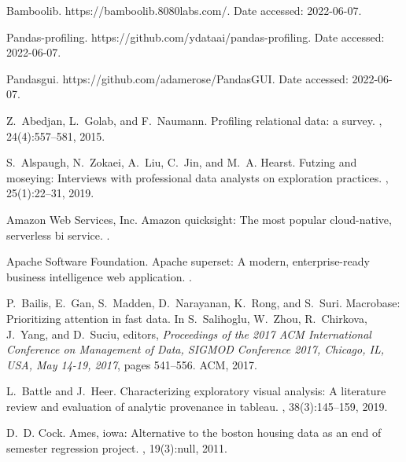 \documentclass[11pt]{article}
\begin{document}
\begin{thebibliography}{10}
\itemsep=1pt
\begin{small}
Bamboolib.
\newblock https://bamboolib.8080labs.com/. Date accessed: 2022-06-07.

Pandas-profiling.
\newblock https://github.com/ydataai/pandas-profiling. Date accessed:
  2022-06-07.

Pandasgui.
\newblock https://github.com/adamerose/PandasGUI. Date accessed: 2022-06-07.

Z.~Abedjan, L.~Golab, and F.~Naumann.
\newblock Profiling relational data: a survey.
, 24(4):557--581, 2015.

S.~Alspaugh, N.~Zokaei, A.~Liu, C.~Jin, and M.~A. Hearst.
\newblock Futzing and moseying: Interviews with professional data analysts on
  exploration practices.
, 25(1):22--31, 2019.

{Amazon Web Services, Inc.}
\newblock Amazon quicksight: The most popular cloud-native, serverless bi
  service.
.

{Apache Software Foundation}.
\newblock Apache superset: A modern, enterprise-ready business intelligence web
  application.
.

P.~Bailis, E.~Gan, S.~Madden, D.~Narayanan, K.~Rong, and S.~Suri.
\newblock Macrobase: Prioritizing attention in fast data.
\newblock In S.~Salihoglu, W.~Zhou, R.~Chirkova, J.~Yang, and D.~Suciu,
  editors, {\em Proceedings of the 2017 {ACM} International Conference on
  Management of Data, {SIGMOD} Conference 2017, Chicago, IL, USA, May 14-19,
  2017}, pages 541--556. {ACM}, 2017.

L.~Battle and J.~Heer.
\newblock Characterizing exploratory visual analysis: {A} literature review and
  evaluation of analytic provenance in tableau.
, 38(3):145--159, 2019.

D.~D. Cock.
\newblock Ames, iowa: Alternative to the boston housing data as an end of
  semester regression project.
, 19(3):null, 2011.


\end{small}
\end{thebibliography}
\end{document}
